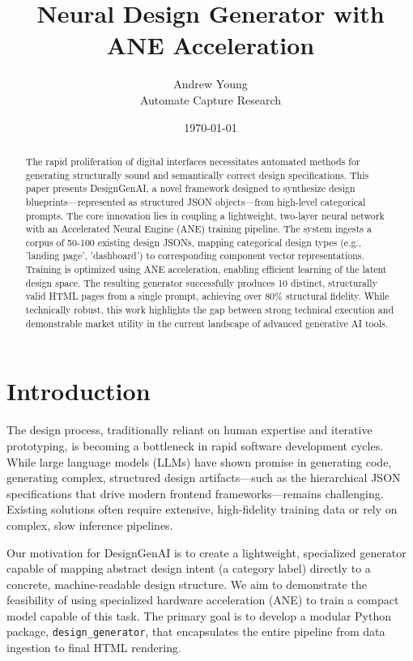 \documentclass[11pt,a4paper]{article}
\title{Neural Design Generator with ANE Acceleration}
\author{Andrew Young \\ Automate Capture Research}
\date{\today}
\begin{document}
\maketitle

\begin{abstract}
The rapid proliferation of digital interfaces necessitates automated methods for generating structurally sound and semantically correct design specifications. This paper presents DesignGenAI, a novel framework designed to synthesize design blueprints—represented as structured JSON objects—from high-level categorical prompts. The core innovation lies in coupling a lightweight, two-layer neural network with an Accelerated Neural Engine (ANE) training pipeline. The system ingests a corpus of 50-100 existing design JSONs, mapping categorical design types (e.g., 'landing page', 'dashboard') to corresponding component vector representations. Training is optimized using ANE acceleration, enabling efficient learning of the latent design space. The resulting generator successfully produces 10 distinct, structurally valid HTML pages from a single prompt, achieving over 80\% structural fidelity. While technically robust, this work highlights the gap between strong technical execution and demonstrable market utility in the current landscape of advanced generative AI tools.
\end{abstract}

\section{Introduction}
The design process, traditionally reliant on human expertise and iterative prototyping, is becoming a bottleneck in rapid software development cycles. While large language models (LLMs) have shown promise in generating code, generating complex, structured design artifacts—such as the hierarchical JSON specifications that drive modern frontend frameworks—remains challenging. Existing solutions often require extensive, high-fidelity training data or rely on complex, slow inference pipelines.

Our motivation for DesignGenAI is to create a lightweight, specialized generator capable of mapping abstract design intent (a category label) directly to a concrete, machine-readable design structure. We aim to demonstrate the feasibility of using specialized hardware acceleration (ANE) to train a compact model capable of this task. The primary goal is to develop a modular Python package, \texttt{design\_generator}, that encapsulates the entire pipeline from data ingestion to final HTML rendering.
\end{document}
